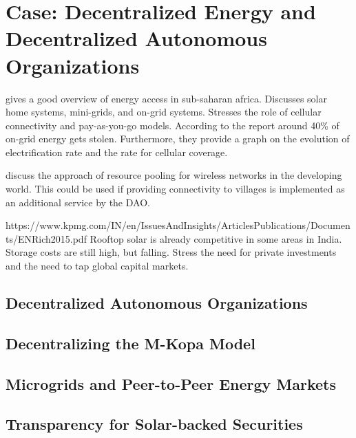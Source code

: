 \chapter{Case: Decentralized Energy and Decentralized Autonomous Organizations}
\label{sec:dao}

\cite{gsma2014} gives a good overview of energy access in sub-saharan africa. Discusses solar home systems, mini-grids, and on-grid systems. Stresses the role of cellular connectivity and pay-as-you-go models. According to the report around 40\% of on-grid energy gets stolen. Furthermore, they provide a graph on the evolution of electrification rate and the rate for cellular coverage.

\cite{DBLP:journals/corr/QadirSWC16} discuss the approach of resource pooling for wireless networks in the developing world. This could be used if providing connectivity to villages is implemented as an additional service by the DAO.

https://www.kpmg.com/IN/en/IssuesAndInsights/ArticlesPublications/Documents/ENRich2015.pdf
Rooftop solar is already competitive in some areas in India. Storage costs are still high, but falling. Stress the need for private investments and the need to tap global capital markets.

\section{Decentralized Autonomous Organizations}

\section{Decentralizing the M-Kopa Model}

\section{Microgrids and Peer-to-Peer Energy Markets}

\section{Transparency for Solar-backed Securities}


